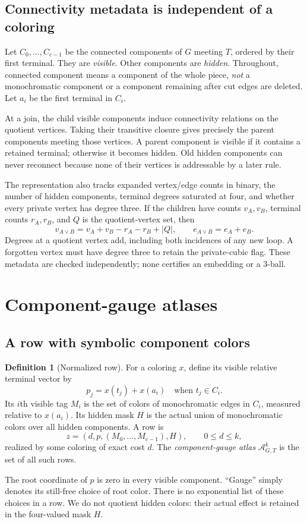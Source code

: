 \documentclass[11pt,letterpaper]{article}
\theoremstyle{definition}
\newtheorem{definition}[theorem]{Definition}
\theoremstyle{remark}\newtheorem{remark}[theorem]{Remark}
\newcommand{\Atlas}{\mathcal A}
\begin{document}
\subsection{Connectivity metadata is independent of a coloring}
Let $C_0,\ldots,C_{c-1}$ be the connected components of $G$ meeting $T$, ordered by their first terminal. They are \emph{visible}. Other components are \emph{hidden}. Throughout, connected component means a component of the whole piece, \emph{not} a monochromatic component or a component remaining after cut edges are deleted. Let $a_i$ be the first terminal in $C_i$.

At a join, the child visible components induce connectivity relations on the quotient vertices. Taking their transitive closure gives precisely the parent components meeting those vertices. A parent component is visible if it contains a retained terminal; otherwise it becomes hidden. Old hidden components can never reconnect because none of their vertices is addressable by a later rule.

The representation also tracks expanded vertex/edge counts in binary, the number of hidden components, terminal degrees saturated at four, and whether every private vertex has degree three. If the children have counts $v_A,v_B$, terminal counts $r_A,r_B$, and $Q$ is the quotient-vertex set, then
\[
 v_{A\vee B}=v_A+v_B-r_A-r_B+|Q|,\qquad e_{A\vee B}=e_A+e_B.
\]
Degrees at a quotient vertex add, including both incidences of any new loop. A forgotten vertex must have degree three to retain the private-cubic flag. These metadata are checked independently; none certifies an embedding or a 3-ball.

\section{Component-gauge atlases}
\label{sec:atlas}
\subsection{A row with symbolic component colors}
\begin{definition}[Normalized row]
For a coloring $x$, define its visible relative terminal vector by
\[
 p_j=x(t_j)+x(a_i)\quad\text{when }t_j\in C_i.
\]
Its $i$th visible tag $M_i$ is the set of colors of monochromatic edges in $C_i$, measured relative to $x(a_i)$. Its hidden mask $H$ is the actual union of monochromatic colors over all hidden components. A row is
\begin{equation}\label{eq:row}
 z=(d,p,(M_0,\ldots,M_{c-1}),H),\qquad 0\le d\le k,
\end{equation}
realized by some coloring of exact cost $d$. The \emph{component-gauge atlas} $\Atlas^k_{G,T}$ is the set of all such rows.
\end{definition}
The root coordinate of $p$ is zero in every visible component. ``Gauge'' simply denotes its still-free choice of root color. There is no exponential list of these choices in a row. We do not quotient hidden colors: their actual effect is retained in the four-valued mask $H$.
\end{document}
